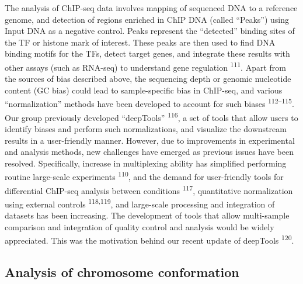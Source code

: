 \documentclass[11pt,twoside]{MPIthesis}
\theoremstyle{definition}
\theoremstyle{definition}
\theoremstyle{definition}
\theoremstyle{remark}
\begin{document}
The analysis of ChIP-seq data involves mapping of sequenced DNA to a
reference genome, and detection of regions enriched in ChIP DNA (called
``Peaks'') using Input DNA as a negative control. Peaks represent the
``detected'' binding sites of the TF or histone mark of interest. These
peaks are then used to find DNA binding motifs for the TFs, detect
target genes, and integrate these results with other assays (such as
RNA-seq) to understand gene regulation \textsuperscript{111}. Apart from
the sources of bias described above, the sequencing depth or genomic
nucleotide content (GC bias) could lead to sample-specific bias in
ChIP-seq, and various ``normalization'' methods have been developed to
account for such biases \textsuperscript{112--115}. Our group previously
developed ``deepTools'' \textsuperscript{116}, a set of tools that allow
users to identify biases and perform such normalizations, and visualize
the downstream results in a user-friendly manner. However, due to
improvements in experimental and analysis methods, new challenges have
emerged as previous issues have been resolved. Specifically, increase in
multiplexing ability has simplified performing routine large-scale
experiments \textsuperscript{110}, and the demand for user-friendly
tools for differential ChIP-seq analysis between conditions
\textsuperscript{117}, quantitative normalization using external
controls \textsuperscript{118,119}, and large-scale processing and
integration of datasets has been increasing. The development of tools
that allow multi-sample comparison and integration of quality control
and analysis would be widely appreciated. This was the motivation behind
our recent update of deepTools \textsuperscript{120}.

\subsection{Analysis of chromosome
conformation}\label{analysis-of-chromosome-conformation}
\end{document}

